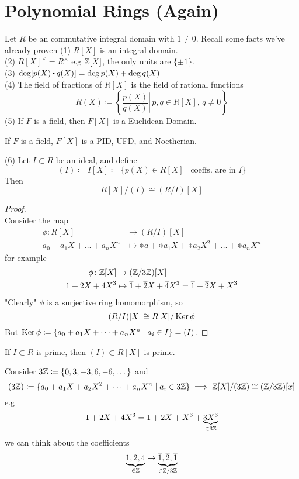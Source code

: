 \documentclass[../Main.tex]{subfiles}
\begin{document}
\newpage
\section*{Polynomial Rings (Again)}

Let $R$ be an commutative integral domain with $1\ne 0$. Recall some facts we've already proven
(1) $R[X]$ is an integral domain.\\
(2) $R[X]^\times=R^\times$ e.g $\mathbb{Z}[X]$, the only units are $\{\pm 1\}$.\\
(3) $\deg[p(X)\rdot q(X)]=\deg p(X)+ \deg q(X)$\\
(4) The field of fractions of $R[X]$ is the field of rational functions
	\[R(X)\coloneqq \left\{ \left. \frac{p(X)}{q(X)} \right| \, p,q\in R[X],\, q\ne 0\right\}\]
(5) If $F$ is a field, then $F[X]$ is a Euclidean Domain.
	\begin{crl}[title = {\texorpdfstring{$F[X]$}{F[X]} is PID, UFD, and Noetherian}]
		If $F$ is a field, $F[X]$ is a PID, UFD, and Noetherian.
	\end{crl}
(6) Let $I\subset R$ be an ideal, and define
	\[(I)\coloneqq I[X] \coloneqq \{p(X)\in R[X]\mid \text{coeffs. are in } I\}\]
	Then 
	\[R[X]/(I)\cong (R/I)[X]\]
\begin{proof}~\\
	Consider the map
	\begin{align*}
	\phi\colon R[X] &\to (R/I)[X] \\
	a_0+a_1X+\dots+a_nX^n &\mapsto \obar{a}+\obar{a_1}X+\obar{a_2}X^2+\dots+\obar{a_n}X^n
	\end{align*}
	for example
	\begin{align*}
	\phi\colon \mathbb{Z}[X] &\to (\mathbb{Z}/3\mathbb{Z})[X] \\
	1+2X+4X^3 &\mapsto \overline{1}+\overline{2}X+\overline{4}X^3=\overline{1}+\overline{2}X+X^3
	\end{align*}
	"Clearly" $\phi$ is a surjective ring homomorphism, so
	\[(R/I)[X]\cong R[X]/\operatorname{Ker} \phi\]
	But $\operatorname{Ker}\phi\coloneqq\{a_0+a_1X+\dots+a_nX^n\mid a_i\in I\}=(I)$.
\end{proof}
\begin{crl}
		If $I\subset R$ is prime, then $(I)\subset R[X]$ is prime.
\end{crl}
\begin{example}
	Consider $3\mathbb{Z} \coloneqq \{0,3,-3,6,-6,\dots\}$ and
	\[(3\mathbb{Z})\coloneqq \{a_0+a_1X+a_2X^2+\dots+a_nX^n\mid a_i\in 3\mathbb{Z}\} \implies \mathbb{Z}[X]/(3\mathbb{Z})\cong (\mathbb{Z}/3\mathbb{Z})[x]\]
	e.g 
	\[1+2X+4X^3=1+2X+X^3+\underbrace{3X^3}_{\in 3\mathbb{Z}}\]
	we can think about the coefficients
	\[\underbrace{1,2,4}_{\in \mathbb{Z}}\to \underbrace{\overline{1},\overline{2},\overline{1}}_{\in \mathbb{Z}/3\mathbb{Z}}\]
\end{example}
\end{document}

